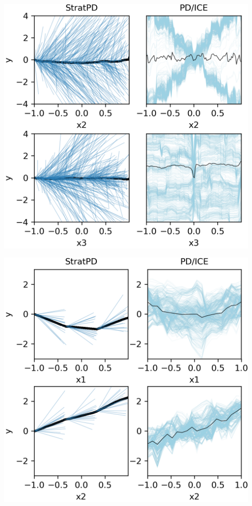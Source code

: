 \documentclass[12pt]{article}
\begin{document}
\begin{minipage}[c]{0.45\textwidth}
\includegraphics[scale=0.7]{images/bigx.png}
\label{fig:bigx_stratpd}
\end{minipage} \begin{minipage}[c]{0.45\textwidth}
\includegraphics[scale=0.7]{images/additivity.png}
\label{fig:additivity_stratpd}
\end{minipage}
\end{document}

